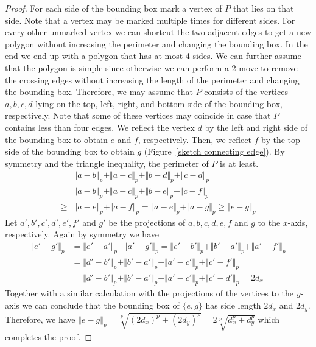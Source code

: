 \documentclass[a4paper, 11pt]{article}
\begin{document}
\begin{proof}
For each side of the bounding box mark a vertex of $P$ that lies on that side. Note that a vertex may be marked multiple times for different sides. For every other unmarked vertex we can shortcut the two adjacent edges to get a new polygon without increasing the perimeter and changing the bounding box. In the end we end up with a polygon that has at most 4 sides. We can further assume that the polygon is simple since otherwise we can perform a 2-move to remove the crossing edges without increasing the length of the perimeter and changing the bounding box. Therefore, we may assume that $P$ consists of the vertices $a,b,c,d$ lying on the top, left, right, and bottom side of the bounding box, respectively. Note that some of these vertices may coincide in case that $P$ contains less than four edges. We reflect the vertex $d$ by the left and right side of the bounding box to obtain $e$ and $f$, respectively. Then, we reflect $f$ by the top side of the bounding box to obtain $g$ (Figure~\ref{sketch connecting edge}). By symmetry and the triangle inequality, the perimeter of $P$ is at least.
\begin{align*}
&\Vert a-b\Vert_p+\Vert a-c\Vert_p+\Vert b-d\Vert_p+\Vert c-d\Vert_p\\
=&\Vert a-b\Vert_p+\Vert a-c\Vert_p+\Vert b-e\Vert_p+\Vert c-f\Vert_p\\
\geq &\Vert a-e\Vert_p+\Vert a-f\Vert_p=\Vert a-e\Vert_p+\Vert a-g\Vert_p\geq \Vert e-g\Vert_p
\end{align*}
Let $a',b',c',d',e',f'$ and $g'$ be the projections of $a,b,c,d,e,f$ and $g$ to the $x$-axis, respectively. Again by symmetry we have
\begin{align*}
\Vert e'-g'\Vert_p&=\Vert e'-a'\Vert_p+\Vert a'-g'\Vert_p=\Vert e'-b'\Vert_p+\Vert b'-a'\Vert_p+\Vert a'-f'\Vert_p\\
&=\Vert d'-b'\Vert_p+\Vert b'-a'\Vert_p+\Vert a'-c'\Vert_p+\Vert c'-f'\Vert_p\\
&=\Vert d'-b'\Vert_p+\Vert b'-a'\Vert_p+\Vert a'-c'\Vert_p+\Vert c'-d'\Vert_p=2d_x
\end{align*}
Together with a similar calculation with the projections of the vertices to the $y$-axis we can conclude that the bounding box of $\{e,g\}$ has side length $2d_x$ and $2d_y$. Therefore, we have $\Vert e-g\Vert_p=\sqrt[p]{(2d_x)^p+(2d_y)^p}=2\sqrt[p]{d_x^p+d_y^p}$ which completes the proof.
\end{proof}
\end{document}
